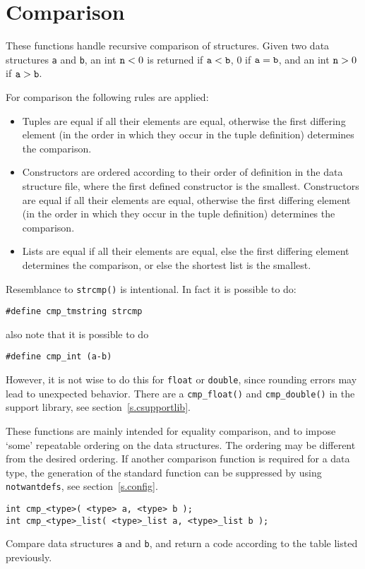 \section{Comparison}
These functions handle recursive comparison of structures.
Given two data structures {\tt a} and {\tt b},
an int ${\tt n}<0$ is returned if ${\tt a}<{\tt b}$,
0 if ${\tt a}={\tt b}$,
and an int ${\tt n}>0$ if ${\tt a}>{\tt b}$.
\par
For comparison the following rules are applied:
\begin{itemize}
\item
Tuples are equal if all their elements are equal,
otherwise the first differing element (in the order in which they occur in
the tuple definition) determines the comparison.
\item
Constructors are ordered according to their order of definition in the
data structure file,
where the first defined constructor is the smallest.
Constructors are equal if all their elements are equal,
otherwise the first differing element (in the order in which they occur
in the tuple definition) determines the comparison.
\item
Lists are equal if all their elements are equal,
else the first differing element determines the comparison,
or else the shortest list is the smallest.
\end{itemize}
\par
Resemblance to {\tt strcmp()} is intentional. In fact it is possible to do:
\begin{showfile}
\begin{verbatim}
#define cmp_tmstring strcmp
\end{verbatim}
\end{showfile}
also note that it is possible to do
\begin{showfile}
\begin{verbatim}
#define cmp_int (a-b)
\end{verbatim}
\end{showfile}
However, it is not wise to do this for {\tt float} or {\tt double},
since rounding errors may lead to unexpected behavior.
There are a {\tt cmp\_float()} and {\tt cmp\_double()} in the support library,
see section~\ref{s.csupportlib}.
\par
These functions are mainly intended for equality comparison,
and to impose `some' repeatable ordering on the data structures.
The ordering may be different from the desired ordering.
If another comparison function is required for a data type,
the generation of the standard function can be suppressed by
using {\tt notwantdefs}, see section~\ref{s.config}.
\begin{verbatim}
int cmp_<type>( <type> a, <type> b );
int cmp_<type>_list( <type>_list a, <type>_list b );
\end{verbatim}
\begin{desc}
Compare data structures {\tt a} and {\tt b}, and return a code
according to the table listed previously.
\end{desc}
